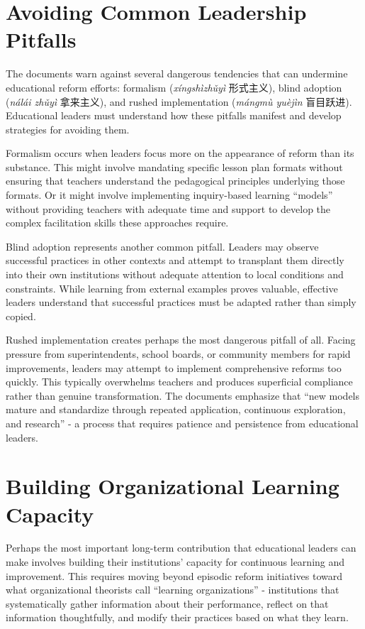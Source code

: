 \documentclass[
  Letterpaper,
]{scrbook}
\begin{document}
\section{Avoiding Common Leadership
Pitfalls}\label{avoiding-common-leadership-pitfalls}

The documents warn against several dangerous tendencies that can
undermine educational reform efforts: formalism (\emph{xíngshìzhǔyì}
形式主义), blind adoption (\emph{nálái zhǔyì} 拿来主义), and rushed
implementation (\emph{mángmù yuèjìn} 盲目跃进). Educational leaders must
understand how these pitfalls manifest and develop strategies for
avoiding them.

Formalism occurs when leaders focus more on the appearance of reform
than its substance. This might involve mandating specific lesson plan
formats without ensuring that teachers understand the pedagogical
principles underlying those formats. Or it might involve implementing
inquiry-based learning ``models'' without providing teachers with
adequate time and support to develop the complex facilitation skills
these approaches require.

Blind adoption represents another common pitfall. Leaders may observe
successful practices in other contexts and attempt to transplant them
directly into their own institutions without adequate attention to local
conditions and constraints. While learning from external examples proves
valuable, effective leaders understand that successful practices must be
adapted rather than simply copied.

Rushed implementation creates perhaps the most dangerous pitfall of all.
Facing pressure from superintendents, school boards, or community
members for rapid improvements, leaders may attempt to implement
comprehensive reforms too quickly. This typically overwhelms teachers
and produces superficial compliance rather than genuine transformation.
The documents emphasize that ``new models mature and standardize through
repeated application, continuous exploration, and research'' - a process
that requires patience and persistence from educational leaders.

\section{Building Organizational Learning
Capacity}\label{building-organizational-learning-capacity}

Perhaps the most important long-term contribution that educational
leaders can make involves building their institutions' capacity for
continuous learning and improvement. This requires moving beyond
episodic reform initiatives toward what organizational theorists call
``learning organizations'' - institutions that systematically gather
information about their performance, reflect on that information
thoughtfully, and modify their practices based on what they learn.
\end{document}
